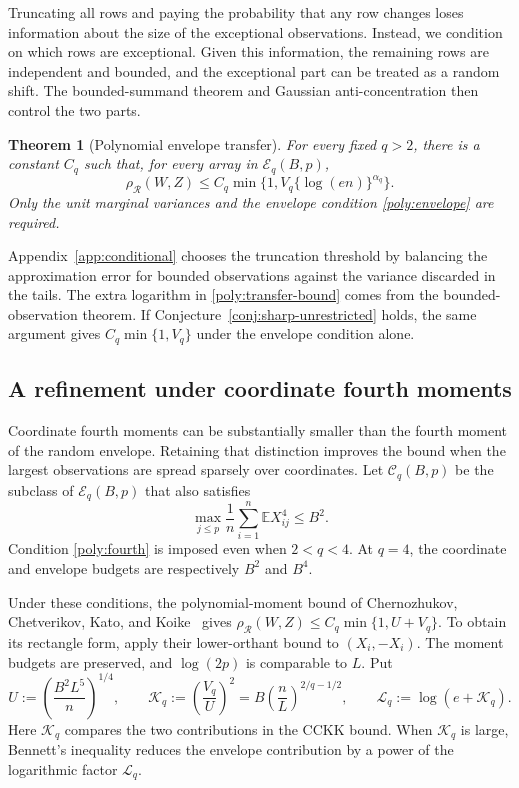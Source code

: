 \documentclass[11pt,letterpaper]{article}
\newtheorem{theorem}{Theorem}
\theoremstyle{remark}
\newcommand{\E}{\mathbb E}
\newcommand{\rh}{\rho_{\mathcal R}}
\begin{document}
Truncating all rows and paying the probability that any row changes
loses information about the size of the exceptional observations.
Instead, we condition on which rows are exceptional. Given this
information, the remaining rows are independent and bounded, and the
exceptional part can be treated as a random shift. The bounded-summand
theorem and Gaussian anti-concentration then control the two parts.

\begin{theorem}[Polynomial envelope transfer]\label{poly:transfer}
For every fixed \(q>2\), there is a constant \(C_q\) such that, for
every array in \(\mathcal E_q(B,p)\),
\begin{equation}
 \rh(W,Z)\le C_q\min\{1,V_q\{\log(en)\}^{\alpha_q}\}.
 \label{poly:transfer-bound}
\end{equation}
Only the unit marginal variances and the envelope condition
\eqref{poly:envelope} are required.
\end{theorem}

Appendix~\ref{app:conditional} chooses the truncation threshold by
balancing the approximation error for bounded observations against the
variance discarded in the tails. The extra logarithm in
\eqref{poly:transfer-bound} comes from the bounded-observation theorem.
If Conjecture~\ref{conj:sharp-unrestricted} holds, the same argument
gives \(C_q\min\{1,V_q\}\) under the envelope condition alone.

\subsection{A refinement under coordinate fourth moments}\label{poly:bennett-sec}

Coordinate fourth moments can be substantially smaller than the fourth
moment of the random envelope. Retaining that distinction improves the
bound when the largest observations are spread sparsely over coordinates.
Let \(\mathcal C_q(B,p)\) be the subclass of \(\mathcal E_q(B,p)\)
that also satisfies
\begin{equation}
 \max_{j\le p}\frac1n\sum_{i=1}^n\E X_{ij}^4\le B^2.
 \label{poly:fourth}
\end{equation}
Condition \eqref{poly:fourth} is imposed even when \(2<q<4\).
At \(q=4\), the coordinate and envelope budgets are respectively
\(B^2\) and \(B^4\).

Under these conditions, the polynomial-moment bound of Chernozhukov,
Chetverikov, Kato, and Koike~\cite[Theorem~2.5]{CCKK2022} gives
\(\rh(W,Z)\le C_q\min\{1,U+V_q\}\). To obtain its rectangle form,
apply their lower-orthant bound to \((X_i,-X_i)\). The moment budgets
are preserved, and \(\log(2p)\) is comparable to \(L\). Put
\begin{equation}
 U:=\left(\frac{B^2L^5}{n}\right)^{1/4},\qquad
 \mathcal K_q:=\left(\frac{V_q}{U}\right)^2
     =B\left(\frac nL\right)^{2/q-1/2},\qquad
 \mathcal{L}_q:=\log(e+\mathcal K_q).
 \label{poly:bennett-parameters}
\end{equation}
Here \(\mathcal K_q\) compares the two contributions in the CCKK bound.
When \(\mathcal K_q\) is large, Bennett's inequality reduces the envelope
contribution by a power of the logarithmic factor \(\mathcal{L}_q\).
\end{document}
